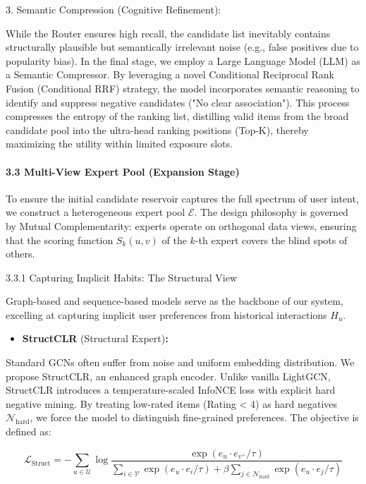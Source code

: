 \documentclass[]{article}
\let\oldparagraph\paragraph
\renewcommand{\paragraph}[1]{\oldparagraph{#1}\mbox{}}
\begin{document}
3. Semantic Compression (Cognitive Refinement):

While the Router ensures high recall, the candidate list inevitably
contains structurally plausible but semantically irrelevant noise (e.g.,
false positives due to popularity bias). In the final stage, we employ a
Large Language Model (LLM) as a Semantic Compressor. By leveraging a
novel Conditional Reciprocal Rank Fusion (Conditional RRF) strategy, the
model incorporates semantic reasoning to identify and suppress negative
candidates ("No clear association"). This process compresses the entropy
of the ranking list, distilling valid items from the broad candidate
pool into the ultra-head ranking positions (Top-K), thereby maximizing
the utility within limited exposure slots.

\hypertarget{multi-view-expert-pool-expansion-stage}{%
\paragraph{3.3 Multi-View Expert Pool (Expansion
Stage)}\label{multi-view-expert-pool-expansion-stage}}

To ensure the initial candidate reservoir captures the full spectrum of
user intent, we construct a heterogeneous expert pool \(\mathcal{E}\).
The design philosophy is governed by Mutual Complementarity: experts
operate on orthogonal data views, ensuring that the scoring function
\(S_{k}\left( u,v \right)\) of the \(k\)-th expert covers the blind
spots of others.

3.3.1 Capturing Implicit Habits: The Structural View

Graph-based and sequence-based models serve as the backbone of our
system, excelling at capturing implicit user preferences from historical
interactions \(H_{u}\).

\begin{itemize}
\item
  \textbf{StructCLR} (Structural Expert)\textbf{:}
\end{itemize}

Standard GCNs often suffer from noise and uniform embedding
distribution. We propose StructCLR, an enhanced graph encoder. Unlike
vanilla LightGCN, StructCLR introduces a temperature-scaled InfoNCE loss
with explicit hard negative mining. By treating low-rated items (Rating
\textless{} 4) as hard negatives \(\mathcal{N}_{\text{hard}}\), we force
the model to distinguish fine-grained preferences. The objective is
defined as:

\[\mathcal{L}_{\text{Struct}} = - \sum_{u \in \mathcal{U}}^{}\log\frac{\exp\left( e_{u} \cdot e_{v^{+}}/\tau \right)}{\sum_{i \in \mathcal{V}}^{}\exp\left( e_{u} \cdot e_{i}/\tau \right) + \beta\sum_{j \in \mathcal{N}_{\text{hard}}}^{}\exp\left( e_{u} \cdot e_{j}/\tau \right)}\]
\end{document}
